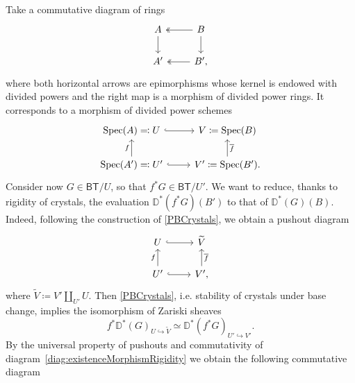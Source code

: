 \begin{rem}
	\label{rem:RigidityEvaluationCrystals}
	Take a commutative diagram of rings
	\begin{equation*}
	\begin{tikzcd}
		A \arrow[d, "", rightarrow] &
		B \arrow[l, "", twoheadrightarrow] 
		\arrow[d, "", rightarrow] \\
		A' &
		B' \arrow[l, "", twoheadrightarrow] 
	,\end{tikzcd}
	\end{equation*}
	where both horizontal arrows are epimorphisms whose kernel
	is endowed with divided powers and the right map is a morphism
	of divided power rings.
	It corresponds to a morphism of divided power schemes
	\begin{equation}\label{diag:existenceMorphismRigidity}
	\begin{tikzcd}
		\spec(A) \eqqcolon U \arrow[r, "", hookrightarrow] &
		V \coloneqq \spec(B) \\
		\spec(A') \eqqcolon U' \arrow[u, "f", rightarrow] 
		\arrow[r, "", hookrightarrow] &
		V' \coloneqq \spec(B') \arrow[u, "\overline{f}"', rightarrow] 
	.\end{tikzcd}
	\end{equation}
	Consider now \(G \in \mathsf{BT}/U\), so that
	\(f^* G \in \mathsf{BT}/U'\).
	We want to reduce, thanks to rigidity of crystals,
	the evaluation \(\mathbb{D}^*(f^*G)(B')\)
	to that of \(\mathbb{D}^*(G)(B)\).
	Indeed, following the construction of \cref{PBCrystals},
	we obtain a pushout diagram
	\begin{equation*}
	\begin{tikzcd}
		U \arrow[r, "", hookrightarrow] &
		\widetilde{V} \\
		U' \arrow[u, "f", rightarrow] 
		\arrow[r, "", hookrightarrow] &
		V' \arrow[u, "\overline{f}"', rightarrow] 
	,\end{tikzcd}
	\end{equation*}
	where \(\widetilde{V} \coloneqq V' \amalg_{ U' } U\).
	Then \cref{PBCrystals}, i.e$.$ stability of crystals under base change,
	implies the isomorphism of Zariski sheaves 
	\begin{equation*}
		f^* \mathbb{D}^*(G)_{ U \hookrightarrow \widetilde{V} } \simeq
		\mathbb{D}^*(f^*G)_{ U' \hookrightarrow V' }
	.\end{equation*}
	By the universal property of pushouts and commutativity of
	diagram~\eqref{diag:existenceMorphismRigidity} we obtain the following
	commutative diagram
	\begin{equation*}

\end{equation*}
\end{rem}
